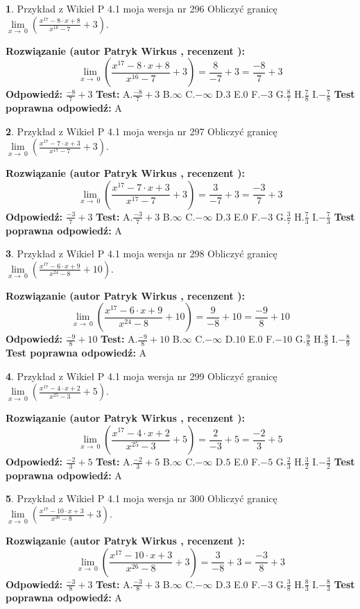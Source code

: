 \documentclass[12pt, a4paper]{article}
\theoremstyle{definition} %
\newtheorem{zad}{}
\newcommand{\zadStart}[1]{\begin{zad}#1\newline}
\newcommand{\zadStop}{\end{zad}}
\newcommand{\rozwStart}[2]{\noindent \textbf{Rozwiązanie (autor #1 , recenzent #2): }\newline}
\newcommand{\rozwStop}{\newline}
\newcommand{\odpStart}{\noindent \textbf{Odpowiedź:}\newline}
\newcommand{\odpStop}{\newline}
\newcommand{\testStart}{\noindent \textbf{Test:}\newline}
\newcommand{\testStop}{\newline}
\newcommand{\kluczStart}{\noindent \textbf{Test poprawna odpowiedź:}\newline}
\newcommand{\kluczStop}{\newline}
\begin{document}
\zadStart{Przykład z Wikieł P 4.1 moja wersja nr 296}
Obliczyć granicę $\lim\limits_{x\to\ 0}(\frac{x^{17}-8 \cdot x +8}{x^{16}-7}+3)$.
\zadStop
\rozwStart{Patryk Wirkus}{}
$$\lim\limits_{x\to\ 0}(\frac{x^{17}-8 \cdot x +8}{x^{16}-7}+3)=\frac{8}{-7}+3=\frac{-8}{7}+3$$
\rozwStop
\odpStart
$\frac{-8}{7}+3$
\odpStop
\testStart
A.$\frac{-8}{7}+3$
B.$\infty$
C.$-\infty$
D.$3$
E.$0$
F.$-3$
G.$\frac{8}{7}$
H.$\frac{7}{8}$
I.$-\frac{7}{8}$
\testStop
\kluczStart
A
\kluczStop



\zadStart{Przykład z Wikieł P 4.1 moja wersja nr 297}
Obliczyć granicę $\lim\limits_{x\to\ 0}(\frac{x^{17}-7 \cdot x +3}{x^{17}-7}+3)$.
\zadStop
\rozwStart{Patryk Wirkus}{}
$$\lim\limits_{x\to\ 0}(\frac{x^{17}-7 \cdot x +3}{x^{17}-7}+3)=\frac{3}{-7}+3=\frac{-3}{7}+3$$
\rozwStop
\odpStart
$\frac{-3}{7}+3$
\odpStop
\testStart
A.$\frac{-3}{7}+3$
B.$\infty$
C.$-\infty$
D.$3$
E.$0$
F.$-3$
G.$\frac{3}{7}$
H.$\frac{7}{3}$
I.$-\frac{7}{3}$
\testStop
\kluczStart
A
\kluczStop



\zadStart{Przykład z Wikieł P 4.1 moja wersja nr 298}
Obliczyć granicę $\lim\limits_{x\to\ 0}(\frac{x^{17}-6 \cdot x +9}{x^{24}-8}+10)$.
\zadStop
\rozwStart{Patryk Wirkus}{}
$$\lim\limits_{x\to\ 0}(\frac{x^{17}-6 \cdot x +9}{x^{24}-8}+10)=\frac{9}{-8}+10=\frac{-9}{8}+10$$
\rozwStop
\odpStart
$\frac{-9}{8}+10$
\odpStop
\testStart
A.$\frac{-9}{8}+10$
B.$\infty$
C.$-\infty$
D.$10$
E.$0$
F.$-10$
G.$\frac{9}{8}$
H.$\frac{8}{9}$
I.$-\frac{8}{9}$
\testStop
\kluczStart
A
\kluczStop



\zadStart{Przykład z Wikieł P 4.1 moja wersja nr 299}
Obliczyć granicę $\lim\limits_{x\to\ 0}(\frac{x^{17}-4 \cdot x +2}{x^{25}-3}+5)$.
\zadStop
\rozwStart{Patryk Wirkus}{}
$$\lim\limits_{x\to\ 0}(\frac{x^{17}-4 \cdot x +2}{x^{25}-3}+5)=\frac{2}{-3}+5=\frac{-2}{3}+5$$
\rozwStop
\odpStart
$\frac{-2}{3}+5$
\odpStop
\testStart
A.$\frac{-2}{3}+5$
B.$\infty$
C.$-\infty$
D.$5$
E.$0$
F.$-5$
G.$\frac{2}{3}$
H.$\frac{3}{2}$
I.$-\frac{3}{2}$
\testStop
\kluczStart
A
\kluczStop



\zadStart{Przykład z Wikieł P 4.1 moja wersja nr 300}
Obliczyć granicę $\lim\limits_{x\to\ 0}(\frac{x^{17}-10 \cdot x +3}{x^{26}-8}+3)$.
\zadStop
\rozwStart{Patryk Wirkus}{}
$$\lim\limits_{x\to\ 0}(\frac{x^{17}-10 \cdot x +3}{x^{26}-8}+3)=\frac{3}{-8}+3=\frac{-3}{8}+3$$
\rozwStop
\odpStart
$\frac{-3}{8}+3$
\odpStop
\testStart
A.$\frac{-3}{8}+3$
B.$\infty$
C.$-\infty$
D.$3$
E.$0$
F.$-3$
G.$\frac{3}{8}$
H.$\frac{8}{3}$
I.$-\frac{8}{3}$
\testStop
\kluczStart
A
\kluczStop
\end{document}
